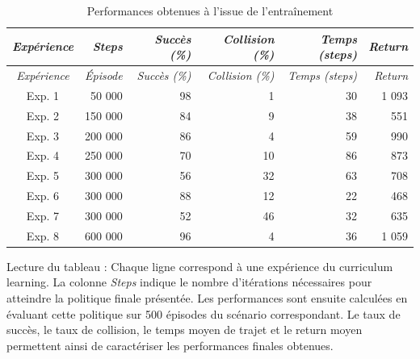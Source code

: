 \begin{longtable}{crrrrr}

    \caption{Performances obtenues à l'issue de l'entraînement} \label{tab:training_perf}                                              \\
    \toprule
    \textit{Expérience} & \textit{Steps}   & \textit{Succès (\%)} & \textit{Collision (\%)} & \textit{Temps (steps)} & \textit{Return} \\
    \midrule
    \endfirsthead
    \toprule
    \textit{Expérience} & \textit{Épisode} & \textit{Succès (\%)} & \textit{Collision (\%)} & \textit{Temps (steps)} & \textit{Return} \\
    \midrule
    \endhead
    \midrule
    \endfoot
    \bottomrule
    \endlastfoot

    Exp. 1              & 50 000           & 98                   & 1                       & 30                     & 1 093           \\
    \midrule
    Exp. 2              & 150 000          & 84                   & 9                       & 38                     & 551             \\
    \midrule
    Exp. 3              & 200 000          & 86                   & 4                       & 59                     & 990             \\
    \midrule
    Exp. 4              & 250 000          & 70                   & 10                      & 86                     & 873             \\
    \midrule
    Exp. 5              & 300 000          & 56                   & 32                      & 63                     & 708             \\
    \midrule
    Exp. 6              & 300 000          & 88                   & 12                      & 22                     & 468             \\
    \midrule
    Exp. 7              & 300 000          & 52                   & 46                      & 32                     & 635             \\
    \midrule
    Exp. 8              & 600 000          & 96                   & 4                       & 36                     & 1 059           \\
\end{longtable}
\vspace{-10pt}
{
    \footnotesize
    \color{darkgray}
    \noindent Lecture du tableau : Chaque ligne correspond à une expérience du curriculum learning. La colonne \textit{Steps} indique le nombre d'itérations nécessaires pour atteindre la politique finale présentée. Les performances sont ensuite calculées en évaluant cette politique sur 500 épisodes du scénario correspondant. Le taux de succès, le taux de collision, le temps moyen de trajet et le return moyen permettent ainsi de caractériser les performances finales obtenues.
}

